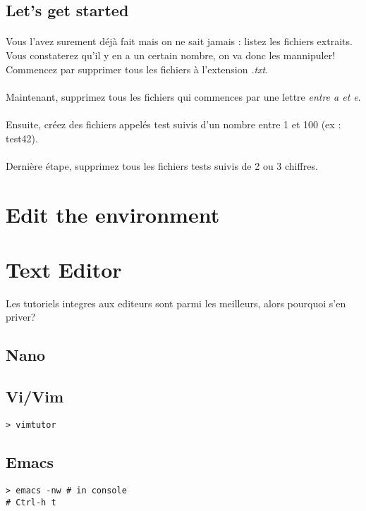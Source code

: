 \documentclass[a4paper]{article}
\begin{document}
\subsection{Let's get started}
\paragraph{}Vous l'avez surement déjà fait mais on ne sait jamais : listez les 
fichiers extraits.\\
Vous constaterez qu'il y en a un certain nombre, on va donc les mannipuler!\\
Commencez par supprimer tous les fichiers à l'extension \emph{.txt}.\\
\paragraph{}Maintenant, supprimez tous les fichiers qui commences par une 
lettre \emph{entre a et e}.
\paragraph{}Ensuite, créez des fichiers appelés test suivis d'un nombre entre 
1 et 100 (ex : test42).
\paragraph{}Dernière étape, supprimez tous les fichiers tests suivis de 2 ou 
3 chiffres.


\section{Edit the environment}

\section{Text Editor}
Les tutoriels integres aux editeurs sont parmi les meilleurs, alors pourquoi
s'en priver?
\subsection{Nano}
\subsection{Vi/Vim} %
\begin{lstlisting}
> vimtutor
\end{lstlisting}
\subsection{Emacs}
\begin{lstlisting}
> emacs -nw # in console
# Ctrl-h t
\end{lstlisting}
\end{document}
